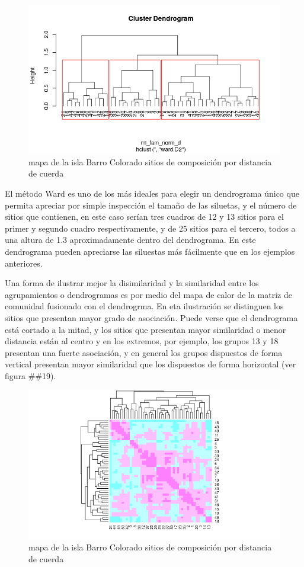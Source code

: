\documentclass[11pt,]{article}
\begin{document}
\begin{figure}
\centering
\includegraphics[width=1.00000\textwidth]{agrupamiento_dendrograma.png}
\caption{mapa de la isla Barro Colorado sitios de composición por
distancia de cuerda \label{fig:bci_map}}
\end{figure}

El método Ward es uno de los más ideales para elegir un dendrograma
único que permita apreciar por simple inspección el tamaño de las
siluetas, y el número de sitios que contienen, en este caso serían tres
cuadros de 12 y 13 sitios para el primer y segundo cuadro
respectivamente, y de 25 sitios para el tercero, todos a una altura de
1.3 aproximadamente dentro del dendrograma. En este dendrograma pueden
apreciarse las siluestas más fácilmente que en los ejemplos anteriores.

Una forma de ilustrar mejor la disimilaridad y la similaridad entre los
agrupamientos o dendrogramas es por medio del mapa de calor de la matriz
de comunidad fusionado con el dendrogrma. En eta ilustración se
distinguen los sitios que presentan mayor grado de asociación. Puede
verse que el dendrograma está cortado a la mitad, y los sitios que
presentan mayor similaridad o menor distancia están al centro y en los
extremos, por ejemplo, los grupos 13 y 18 presentan una fuerte
asociación, y en general los grupos dispuestos de forma vertical
presentan mayor similaridad que los dispuestos de forma horizontal (ver
figura \#\#19).

\begin{figure}
\centering
\includegraphics[width=1.00000\textwidth]{comparacion_dendrograma_mapa_calor.png}
\caption{mapa de la isla Barro Colorado sitios de composición por
distancia de cuerda \label{fig:bci_map}}
\end{figure}
\end{document}
